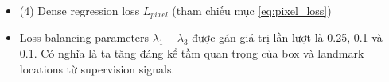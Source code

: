 \documentclass[12pt, a4paper, oneside]{book}
\theoremstyle{plain}
\numberwithin{equation}{chapter} \DeclareMathOperator{\Var}{var}
\begin{document}
\begin{itemize}
    \begin{itemize}
        \item[+] Với \(l_i = \{l_{x_1}, l_{y_1}, \dots, l_{x_5}, l_{y_5}\}_i\) và \(l_i = \{l_{x_1}^*, l_{y_1}^*, \dots, l_{x_5}^*, l_{y_5}^*\}_i\) lần lượt là predicted 5 facial landmarks và grouth truth liên quan đến positive anchor.
        \item[+] Tương tự box centre regression, 5 facial landmark regression cũng sử dụng target normalisation dựa trên anchor centre. 
    \end{itemize}
    \item[--](4) Dense regression loss \(L_{pixel}\) (tham chiếu mục \eqref{eq:pixel_loss})
    \item[--] Loss-balancing parameters \(\lambda_1-\lambda_3\) được gán giá trị lần lượt là 0.25, 0.1 và 0.1. Có nghĩa là ta tăng đáng kể tầm quan trọng của box và landmark locations từ supervision signals.
\end{itemize} 
\end{document}
